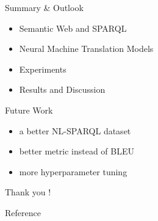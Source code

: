 \documentclass[11pt]{beamer}
\begin{document}
\begin{frame}{Summary \& Outlook}
    \begin{itemize}
        \item Semantic Web and SPARQL
        \item Neural Machine Translation Models
        \item Experiments
        \item Results and Discussion
        \pause
    \end{itemize}
    \begin{block}{Future Work}
        \begin{itemize}
            \item a better NL-SPARQL dataset
            \item better metric instead of BLEU
            \item more hyperparameter tuning
        \end{itemize}
    \end{block}
\end{frame}

\begin{frame}
\begin{center}
    \begin{LARGE}
        Thank you !
    \end{LARGE}
\end{center}
\end{frame}

\begin{frame}{Reference}


\end{frame}
\end{document}
